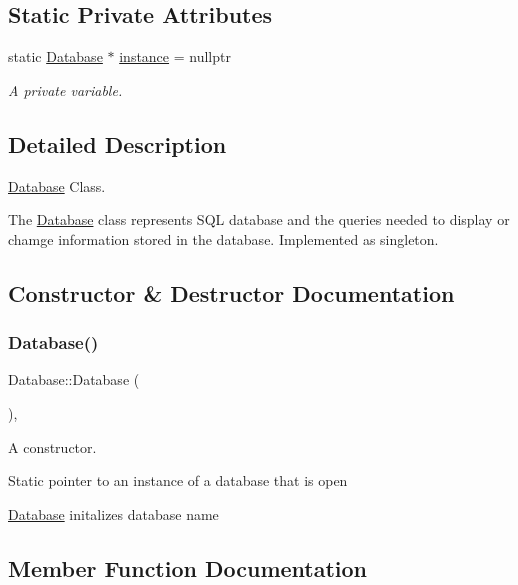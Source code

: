 \subsection*{Static Private Attributes}
\begin{DoxyCompactItemize}
\item 
static \hyperlink{class_database}{Database} $\ast$ \hyperlink{class_database_a5926460fe1c15c95d470fcde637f8d22}{instance} = nullptr
\begin{DoxyCompactList}\small\item\em A private variable. \end{DoxyCompactList}\end{DoxyCompactItemize}


\subsection{Detailed Description}
\hyperlink{class_database}{Database} Class. 

The \hyperlink{class_database}{Database} class represents S\+QL database and the queries needed to display or chamge information stored in the database. Implemented as singleton. 

\subsection{Constructor \& Destructor Documentation}
\mbox{\label{class_database_a4703c80e6969d33565ea340f768fdadf}} 
\subsubsection{\texorpdfstring{Database()}{Database()}}
{\footnotesize\ttfamily Database\+::\+Database (\begin{DoxyParamCaption}{ }\end{DoxyParamCaption})\hspace{0.3cm}{\ttfamily [inline]}, {\ttfamily [private]}}



A constructor. 

Static pointer to an instance of a database that is open

\hyperlink{class_database}{Database} initalizes database name 

\subsection{Member Function Documentation}
\mbox{\label{class_database_aeaa8fe739adf1bf12343ee8d40125ddd}} 
